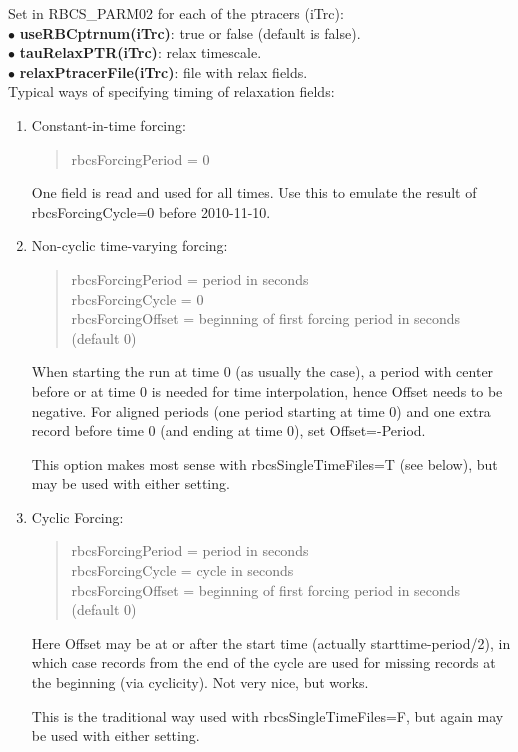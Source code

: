 \vspace{.5cm}
\noindent
Set in {RBCS\_PARM02} for each of the ptracers (iTrc):\\
$\bullet$ {\bf useRBCptrnum(iTrc)}: true or false (default
is false).\\
$\bullet$ {\bf tauRelaxPTR(iTrc)}: relax timescale.\\
$\bullet$ {\bf relaxPtracerFile(iTrc)}: file with relax
fields.\\

\noindent
Typical ways of specifying timing of relaxation fields:
\begin{enumerate}
\item Constant-in-time forcing:
  \begin{quote}
     rbcsForcingPeriod = 0
  \end{quote}
  One field is read and used for all times.  Use this to emulate the result of
  rbcsForcingCycle=0 before 2010-11-10.

\item Non-cyclic time-varying forcing:
  \begin{quote}
     rbcsForcingPeriod = period in seconds\\
     rbcsForcingCycle = 0\\
     rbcsForcingOffset = beginning of first forcing period in seconds (default 0)
  \end{quote}
  When starting the run at time 0 (as usually the case), a period with center before
  or at time 0 is needed for time interpolation, hence Offset needs to be negative.
  For aligned periods (one period starting at time 0) and one extra record before
  time 0 (and ending at time 0), set Offset=-Period.

  This option makes most sense with rbcsSingleTimeFiles=T (see below), but may be
  used with either setting.

\item Cyclic Forcing:
  \begin{quote}
     rbcsForcingPeriod = period in seconds\\
     rbcsForcingCycle = cycle in seconds\\
     rbcsForcingOffset = beginning of first forcing period in seconds (default 0)
  \end{quote}
  Here Offset may be at or after the start time (actually starttime-period/2),
  in which case records from the end of the cycle are used for missing records at
  the beginning (via cyclicity).  Not very nice, but works.

  This is the traditional way used with rbcsSingleTimeFiles=F, but again may be
  used with either setting.
\end{enumerate}

